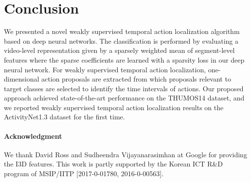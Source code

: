 \documentclass[10pt,twocolumn,letterpaper]{article}
\begin{document}
 
\section{Conclusion}
\label{sec:conclusion}
We presented a novel weakly supervised temporal action localization algorithm based on deep neural networks.
The classification is performed by evaluating a video-level representation given by a sparsely weighted mean of segment-level features where the sparse coefficients are learned with a sparsity loss in our deep neural network.
For weakly supervised temporal action localization, one-dimensional action proposals are extracted from which proposals relevant to target classes are selected to identify the time intervals of actions.
Our proposed approach achieved state-of-the-art performance on the THUMOS14 dataset, and we reported weakly supervised temporal action localization results on the ActivityNet1.3 dataset for the first time.
 
\vspace{-0.2cm}
\paragraph*{Acknowledgment}
We thank David Ross and Sudheendra Vijayanarasimhan at Google for providing the I3D features. 
This work is partly supported by the Korean ICT R\&D program of MSIP/IITP [2017-0-01780, 2016-0-00563].


{\small


}
\end{document}
